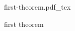 \documentclass[12pt,a4paper]{article}
\newcommand{\incfig}[1]{%
    \def\svgwidth{\columnwidth}
    {#1.pdf_tex}
}
\begin{document}
\begin{figure}[ht]
    \centering
    \incfig{first-theorem}
    \caption{first theorem}
    \label{fig:first-theorem}
\end{figure}
\end{document}
